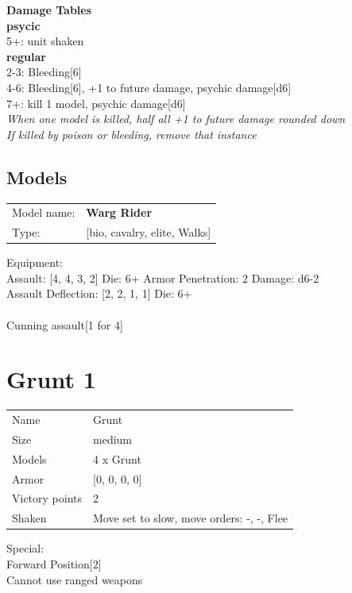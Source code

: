 {\bf Damage Tables} \\
 {\bf psycic } \\
5+: unit shaken \\
 {\bf regular } \\
2-3: Bleeding[6] \\
4-6: Bleeding[6], +1 to future damage, psychic damage[d6] \\
7+: kill 1 model, psychic damage[d6] \\
{{\it When one model is killed, half all +1 to future damage rounded down}} \\
{{\it If killed by poison or bleeding, remove that instance}} \\


\clearpage

\subsection{ Models }

\begin{tabular}{ll}
Model name: & {\bf Warg Rider } \\
Type: & [bio, cavalry, elite, Walks] \\
\end{tabular}

Equipment:  \\

Assault: [4, 4, 3, 2] Die: 6+ Armor Penetration: 2 Damage: d6-2 \\
Assault Deflection: [2, 2, 1, 1] Die: 6+\\
\\ 
Cunning assault[1 for 4]\\ 
 



 















\clearpage

\section{ Grunt 1 }

\begin{tabular}{ll}
  Name & Grunt \\
  Size & medium\\
  Models & 4 x Grunt\\
  Armor & [0, 0, 0, 0]\\
  Victory points & 2\\
  Shaken & Move set to slow, move orders: -, -, Flee\\
\end{tabular}
Special: \\
Forward Position[2]\\ 
Cannot use ranged weapons\\ 



